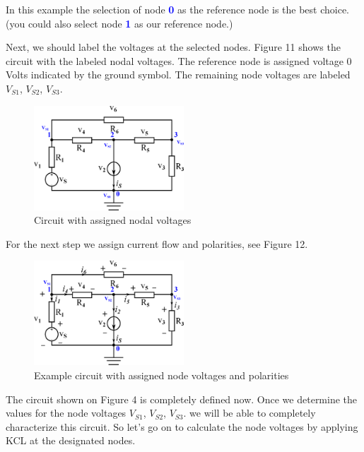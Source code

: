 \documentclass[a4 paper]{article}
\newcommand{\blue}[1]{\textcolor{blue}{#1}}
\numberwithin{equation}{section}
\newcommand{\0}{\mathbf{0}}
\begin{document}
In this example the selection of node \blue{{\bf 0}} as the reference node is the best choice. (you could also select node \blue{{\bf 1}} as our reference node.) 

Next, we should label the voltages at the selected nodes. Figure 11 shows the circuit with the labeled nodal voltages. The reference node is assigned voltage 0 Volts indicated by the ground symbol. The remaining node voltages are labeled $V_{S1}$, $V_{S2}$, $V_{S3}$.


\begin{figure}[ht!]
  \caption{Circuit with assigned nodal voltages}
  \centering
  \includegraphics[width=0.5\textwidth]{./images/nodemethod_3}
\end{figure}


For the next step we assign current flow and polarities, see Figure 12.
\begin{figure}[ht!]
  \caption{Example circuit with assigned node voltages and polarities}
  \centering
  \includegraphics[width=0.5\textwidth]{./images/nodemethod_4}
\end{figure}
The circuit shown on Figure 4 is completely defined now. Once we determine the values for the node voltages $V_{S1}$, $V_{S2}$, $V_{S3}$. we will be able to completely characterize this circuit. So let's go on to calculate the node voltages by applying KCL at the designated nodes. \newline
\end{document}
